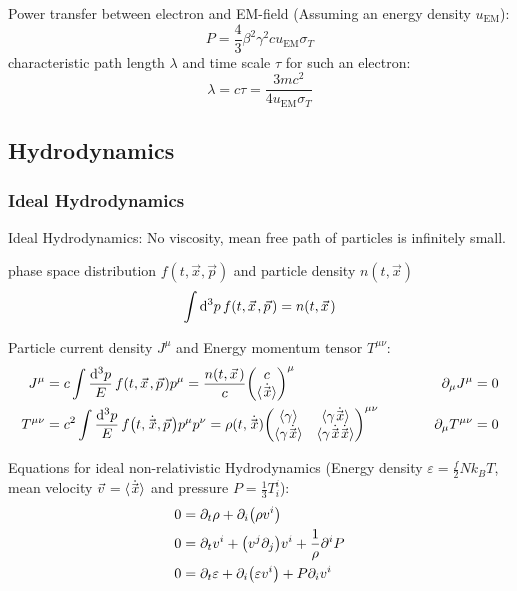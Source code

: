			Power transfer between electron and EM-field (Assuming an energy density $u_\mathrm{EM}$):
			\begin{equation}
				P = \frac{4}{3} \beta^2 \gamma^2 c u_\mathrm{EM} \sigma_T
			\end{equation}
			characteristic path length $\lambda$ and time scale $\tau$ for such an electron:
			\begin{equation}
				\lambda = c\tau = \frac{3 m c^2}{4 u_\mathrm{EM} \sigma_T}
			\end{equation}



	\subsection{Hydrodynamics}
		\subsubsection{Ideal Hydrodynamics}	
			Ideal Hydrodynamics: No viscosity, mean free path of particles is infinitely small.

			\noindent
			phase space distribution $f(t, \vec{x},\vec{p})$ and particle density $n(t,\vec{x})$
			\begin{equation}
				\int \dd^3 p\, f\qty(t, \vec{x}, \vec{p}) = n\qty(t,\vec{x})
			\end{equation}

			\noindent
			Particle current density $J^\mu$ and Energy momentum tensor $T^{\mu\nu}$:
			\begin{equation}
				\begin{aligned}
					J^{\mu} &= c \int \frac{\dd^3 p}{E}\, f\qty(t, \vec{x}, \vec{p}) p^{\mu} = \frac{n(t, \vec{x})}{c} \mqty(c\\\avg{\dot{\vec{x}}})^\mu 
					&\hsp
					\partial_\mu J^{\mu} &= 0 \\
					T^{\mu\nu} &= c^2 \int \frac{\dd^3 p}{E}\, f\qty(t, \dot{\vec{x}}, \vec{p}) p^{\mu} p^{\nu} =\rho(t, \dot{\vec{x}})\mqty(\avg{\gamma} & \avg{\gamma \dot{\vec{x}}} \\ \avg{\gamma \dot{\vec{x}}} & \avg{\gamma\dot{\vec{x}}\dot{\vec{x}}})^{\mu\nu}
					&\hsp
					\partial_\mu T^{\mu\nu} &= 0 \\
				\end{aligned}
			\end{equation}

			\noindent
			Equations for ideal non-relativistic Hydrodynamics (Energy density $\varepsilon=\frac{f}{2}N k_B T$, mean velocity $\vec{v}=\avg{\dot{\vec{x}}}$ and pressure $P = \frac{1}{3} T^{i}_i$):
			\begin{equation}
				\begin{aligned}
					0 &= \partial_t \rho + \partial_i \qty(\rho v^i) \\
					0 &= \partial_t v^i + \qty(v^j \partial_j) v^i + \frac{1}{\rho} \partial^i P \\
					0 &= \partial_t \varepsilon + \partial_i \qty(\varepsilon v^i) + P \partial_i v^i  \\
				\end{aligned}
			\end{equation}


